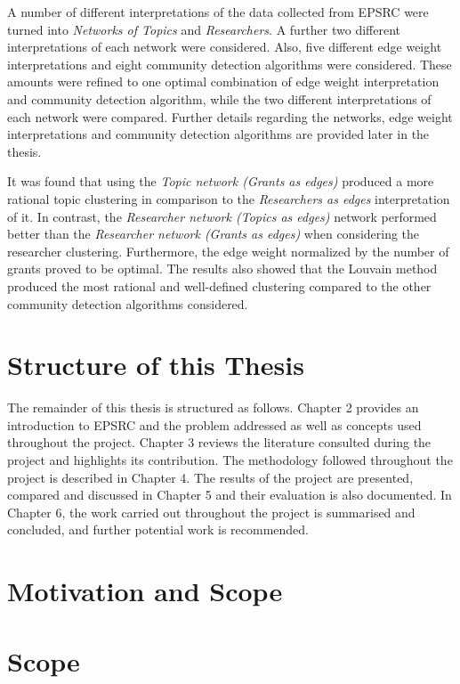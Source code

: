 A number of different interpretations of the data collected from EPSRC were turned into \textit{Networks of Topics} and \textit{Researchers}. A further two different interpretations of each network were considered. Also, five different edge weight interpretations and eight community detection algorithms were considered. These amounts were refined to one optimal combination of edge weight interpretation and community detection algorithm, while the two different interpretations of each network were compared. Further details regarding the networks, edge weight interpretations and community detection algorithms are provided later in the thesis.

It was found that using the \textit{Topic network (Grants as edges)} produced a more rational topic clustering in comparison to the \textit{Researchers as edges} interpretation of it. In contrast, the \textit{Researcher network (Topics as edges)} network performed better than the \textit{Researcher network (Grants as edges)} when considering the researcher clustering. Furthermore, the edge weight normalized by the number of grants proved to be optimal. The results also showed that the Louvain method produced the most rational and well-defined clustering compared to the other community detection algorithms considered.

\section{Structure of this Thesis}

The remainder of this thesis is structured as follows. Chapter 2 provides an introduction to EPSRC and the problem addressed as well as concepts used throughout the project. Chapter 3 reviews the literature consulted during the project and highlights its contribution. The methodology followed throughout the project is described in Chapter 4. The results of the project are presented, compared and discussed in Chapter 5 and their evaluation is also documented. In Chapter 6, the work carried out throughout the project is summarised and concluded, and further potential work is recommended.

\iffalse
\section{Motivation and Scope}

\section{Scope}


